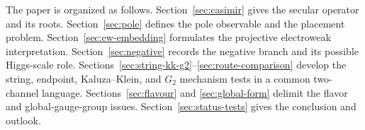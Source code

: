 The paper is organized as follows.  Section~\ref{sec:casimir} gives the secular operator and its roots.  Section~\ref{sec:pole} defines the pole observable and the placement problem.  Section~\ref{sec:ew-embedding} formulates the projective electroweak interpretation.  Section~\ref{sec:negative} records the negative branch and its possible Higgs-scale role.  Sections~\ref{sec:string-kk-g2}--\ref{sec:route-comparison} develop the string, endpoint, Kaluza--Klein, and \(G_2\) mechanism tests in a common two-channel language.  Sections~\ref{sec:flavour} and \ref{sec:global-form} delimit the flavor and global-gauge-group issues.  Section~\ref{sec:status-tests} gives the conclusion and outlook.
